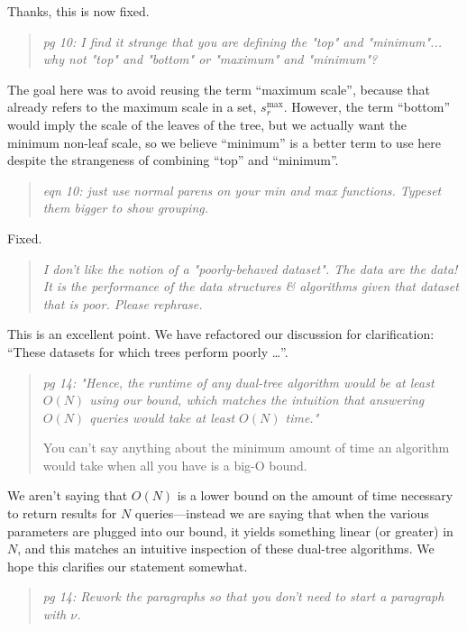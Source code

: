 \documentclass[twoside,11pt]{article}
\begin{document}
Thanks, this is now fixed.

\begin{quote}{\it
pg 10: I find it strange that you are defining the "top" and "minimum"... why
not "top" and "bottom" or "maximum" and "minimum"?
}\end{quote}

The goal here was to avoid reusing the term ``maximum scale'', because that
already refers to the maximum scale in a set, $s_r^{\max}$.  However, the term
``bottom'' would imply the scale of the leaves of the tree, but we actually want
the minimum non-leaf scale, so we believe ``minimum'' is a better term to use
here despite the strangeness of combining ``top'' and ``minimum''.

\begin{quote}{\it
eqn 10: just use normal parens on your min and max functions.  Typeset them
bigger to show grouping.
}\end{quote}

Fixed.

\begin{quote}{\it
I don't like the notion of a "poorly-behaved dataset".  The data are
the data!  It is the performance of the data structures \& algorithms
given that dataset that is poor.  Please rephrase.
}\end{quote}

This is an excellent point.  We have refactored our discussion for
clarification: ``These datasets for which trees perform poorly \ldots''.

\begin{quote}{\it
pg 14:
"Hence, the runtime of any dual-tree algorithm would be at least $O(N)$
using our bound, which matches the intuition that answering $O(N)$
queries would take at least $O(N)$ time."

You can't say anything about the minimum amount of time an algorithm
would take when all you have is a big-O bound.
}\end{quote}

We aren't saying that $O(N)$ is a lower bound on the amount of time necessary to
return results for $N$ queries---instead we are saying that when the various
parameters are plugged into our bound, it yields something linear (or greater)
in $N$, and this matches an intuitive inspection of these dual-tree algorithms.
We hope this clarifies our statement somewhat.

\begin{quote}{\it
pg 14:
Rework the paragraphs so that you don't need to start a paragraph with $\nu$.
}\end{quote}
\end{document}

